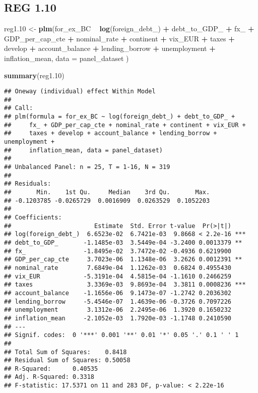 \documentclass[]{article}
\newenvironment{Shaded}{\begin{snugshade}}{\end{snugshade}}
\newcommand{\KeywordTok}[1]{\textcolor[rgb]{0.13,0.29,0.53}{\textbf{#1}}}
\newcommand{\DataTypeTok}[1]{\textcolor[rgb]{0.13,0.29,0.53}{#1}}
\newcommand{\DecValTok}[1]{\textcolor[rgb]{0.00,0.00,0.81}{#1}}
\newcommand{\StringTok}[1]{\textcolor[rgb]{0.31,0.60,0.02}{#1}}
\newcommand{\OperatorTok}[1]{\textcolor[rgb]{0.81,0.36,0.00}{\textbf{#1}}}
\newcommand{\NormalTok}[1]{#1}
\begin{document}
\subsection{REG 1.10}\label{reg-1.10}

\begin{Shaded}
\begin{Highlighting}[]
\NormalTok{reg1.}\DecValTok{10}\NormalTok{ <-}\StringTok{ }\KeywordTok{plm}\NormalTok{(for_ex_BC }\OperatorTok{~}\StringTok{ }\KeywordTok{log}\NormalTok{(foreign_debt_) }\OperatorTok{+}\StringTok{ }\NormalTok{debt_to_GDP_ }\OperatorTok{+}\StringTok{ }\NormalTok{fx_ }\OperatorTok{+}\StringTok{ }\NormalTok{GDP_per_cap_cte }\OperatorTok{+}\StringTok{ }\NormalTok{nominal_rate }\OperatorTok{+}\StringTok{ }\NormalTok{continent }\OperatorTok{+}\StringTok{ }\NormalTok{vix_EUR }\OperatorTok{+}\StringTok{ }\NormalTok{taxes }\OperatorTok{+}\StringTok{ }\NormalTok{develop }\OperatorTok{+}\StringTok{ }\NormalTok{account_balance }\OperatorTok{+}\StringTok{ }\NormalTok{lending_borrow }\OperatorTok{+}\StringTok{ }\NormalTok{unemployment }\OperatorTok{+}\StringTok{ }\NormalTok{inflation_mean, }\DataTypeTok{data =}\NormalTok{ panel_dataset )}

\KeywordTok{summary}\NormalTok{(reg1.}\DecValTok{10}\NormalTok{)}
\end{Highlighting}
\end{Shaded}

\begin{verbatim}
## Oneway (individual) effect Within Model
## 
## Call:
## plm(formula = for_ex_BC ~ log(foreign_debt_) + debt_to_GDP_ + 
##     fx_ + GDP_per_cap_cte + nominal_rate + continent + vix_EUR + 
##     taxes + develop + account_balance + lending_borrow + unemployment + 
##     inflation_mean, data = panel_dataset)
## 
## Unbalanced Panel: n = 25, T = 1-16, N = 319
## 
## Residuals:
##       Min.    1st Qu.     Median    3rd Qu.       Max. 
## -0.1203785 -0.0265729  0.0016909  0.0263529  0.1052203 
## 
## Coefficients:
##                       Estimate  Std. Error t-value  Pr(>|t|)    
## log(foreign_debt_)  6.6523e-02  6.7421e-03  9.8668 < 2.2e-16 ***
## debt_to_GDP_       -1.1485e-03  3.5449e-04 -3.2400 0.0013379 ** 
## fx_                -1.8495e-02  3.7472e-02 -0.4936 0.6219900    
## GDP_per_cap_cte     3.7023e-06  1.1348e-06  3.2626 0.0012391 ** 
## nominal_rate        7.6849e-04  1.1262e-03  0.6824 0.4955430    
## vix_EUR            -5.3191e-04  4.5815e-04 -1.1610 0.2466259    
## taxes               3.3369e-03  9.8693e-04  3.3811 0.0008236 ***
## account_balance    -1.1656e-06  9.1473e-07 -1.2742 0.2036302    
## lending_borrow     -5.4546e-07  1.4639e-06 -0.3726 0.7097226    
## unemployment        3.1312e-06  2.2495e-06  1.3920 0.1650232    
## inflation_mean     -2.1052e-03  1.7920e-03 -1.1748 0.2410590    
## ---
## Signif. codes:  0 '***' 0.001 '**' 0.01 '*' 0.05 '.' 0.1 ' ' 1
## 
## Total Sum of Squares:    0.8418
## Residual Sum of Squares: 0.50058
## R-Squared:      0.40535
## Adj. R-Squared: 0.3318
## F-statistic: 17.5371 on 11 and 283 DF, p-value: < 2.22e-16
\end{verbatim}
\end{document}
